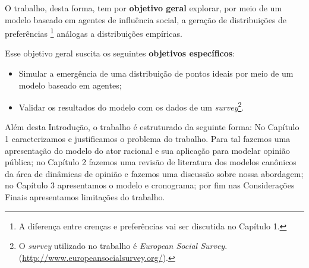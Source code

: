 O trabalho, desta forma, tem por \textbf{objetivo geral} explorar, por meio
de um modelo baseado em agentes de influência social, a geração de distribuições
de preferências \footnote{A diferença entre crenças e preferências vai ser
discutida no Capítulo 1.} análogas a distribuições empíricas.

Esse objetivo geral suscita os seguintes \textbf{objetivos específicos}:

\begin{itemize}
\item Simular a emergência de uma distribuição de pontos ideais por meio de um
  modelo baseado em agentes; 
\item Validar os resultados do modelo com os dados de
  um \textit{survey}\footnote{O \textit{survey} utilizado no trabalho é
    \textit{European Social Survey}.
    (\url{http://www.europeansocialsurvey.org/}). }.
\end{itemize}

Além desta Introdução, o trabalho é estruturado da seguinte forma: No Capítulo 1
caracterizamos e justificamos o problema do trabalho. Para tal fazemos uma
apresentação do modelo do ator racional e sua aplicação para modelar opinião
pública; no Capítulo 2 fazemos uma revisão de literatura dos modelos canônicos
da área de dinâmicas de opinião e fazemos uma discussão sobre nossa abordagem;
no Capítulo 3 apresentamos o modelo e cronograma; por fim nas
Considerações Finais apresentamos limitações do trabalho.








